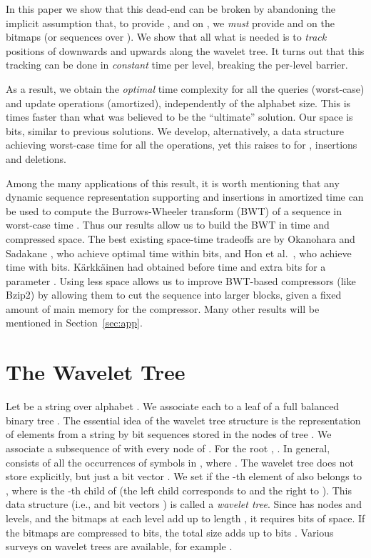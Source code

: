 \documentclass[11pt]{article}
\newcommand{\no}[1]{}
\begin{document}
In this paper we show that this dead-end can be broken by abandoning the
implicit assumption that, to provide ,  and  on , we
{\em must} provide  and  on the bitmaps (or sequences over 
). We show that
all what is needed is to {\em track} positions of  downwards and upwards
along the wavelet tree. It turns out that this tracking can be done in 
{\em constant} time per level, breaking the  per-level
barrier.

As a result, we obtain the {\em optimal} time complexity
 for all the queries (worst-case) and update operations
(amortized), independently of the alphabet size.
This is  times faster 
than what was believed to be the ``ultimate'' solution. 
Our space is  bits, similar to previous solutions.
We develop, alternatively, a data structure achieving worst-case time for all 
the operations, yet this raises to  for , insertions and 
deletions. 
\no{The set of operations can be extended to more general splitting,
concatenations, and block moves, at  time cost per operation.
The only previous solution handling these operations \cite{NS10} achieved
.}

Among the many applications of this result, it is worth mentioning that 
any dynamic sequence representation supporting  and insertions in 
amortized time can be used to compute the Burrows-Wheeler transform (BWT)
\cite{BW94} of a sequence  in worst-case time . Thus our 
results allow us to build the BWT in  time and compressed
space. The best existing space-time tradeoffs are by Okanohara and Sadakane 
\cite{OS09}, who achieve optimal  time within 
 bits, and Hon et al.~\cite{HSS09}, who 
achieve  time with  bits. 
K\"arkk\"ainen \cite{Kar07} had obtained before  time and
 extra bits for a parameter .
Using less space
allows us to improve BWT-based compressors (like {\sc Bzip2}) by allowing them
to cut the sequence into larger blocks, given a fixed amount of main memory
for the compressor. 
Many other results will be mentioned in Section~\ref{sec:app}.


\section{The Wavelet Tree}
\label{sec:wavel}

Let  be a string over alphabet .  We associate each
 to a leaf  of a full balanced  binary tree . The essential idea of the wavelet tree structure \cite{GGV03} is the representation of elements from a string  by bit sequences stored in
 the nodes of tree . We  associate a subsequence  
of  with every node  of . For the root , . 
In general,  consists of all the occurrences of symbols  
in , where .
The wavelet tree does not store  explicitly, but just a bit vector
. We set  if the -th element
of  also belongs to , where  is the -th child of 
(the left child corresponds to  and the right to ).
This data structure (i.e.,  and bit vectors ) is called a 
\emph{wavelet tree}. Since  has  nodes and 
 levels, and the bitmaps at each level add up to length
, it requires  bits of space. If
the bitmaps  are compressed to  bits, the total size
adds up to  bits \cite{GGV03}. Various surveys on
wavelet trees are available, for example \cite{NM06,Nav12}.
\end{document}
